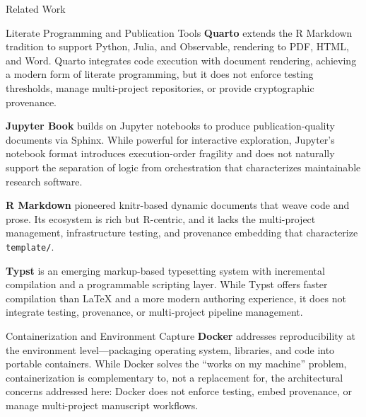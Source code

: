 \documentclass[
  ignorenonframetext,
]{beamer}
\begin{document}
\begin{frame}{Related Work}
\begin{block}{Literate Programming and Publication Tools}
\textbf{Quarto}  extends the R Markdown
tradition to support Python, Julia, and Observable, rendering to PDF,
HTML, and Word. Quarto integrates code execution with document
rendering, achieving a modern form of literate programming, but it does
not enforce testing thresholds, manage multi-project repositories, or
provide cryptographic provenance.

\textbf{Jupyter Book}  builds on Jupyter
notebooks to produce publication-quality documents via Sphinx. While
powerful for interactive exploration, Jupyter's notebook format
introduces execution-order fragility  and does
not naturally support the separation of logic from orchestration that
characterizes maintainable research software.

\textbf{R Markdown}  pioneered knitr-based dynamic
documents that weave code and prose. Its ecosystem is rich but
R-centric, and it lacks the multi-project management, infrastructure
testing, and provenance embedding that characterize \texttt{template/}.

\textbf{Typst}  is an emerging markup-based
typesetting system with incremental compilation and a programmable
scripting layer. While Typst offers faster compilation than LaTeX and a
more modern authoring experience, it does not integrate testing,
provenance, or multi-project pipeline management.
\end{block}

\begin{block}{Containerization and Environment Capture}
\protect{}\label{containerization-and-environment-capture}
\textbf{Docker}  addresses reproducibility at
the environment level---packaging operating system, libraries, and code
into portable containers. While Docker solves the ``works on my
machine'' problem, containerization is complementary to, not a
replacement for, the architectural concerns addressed here: Docker does
not enforce testing, embed provenance, or manage multi-project
manuscript workflows.
\end{block}


\end{frame}
\end{document}
